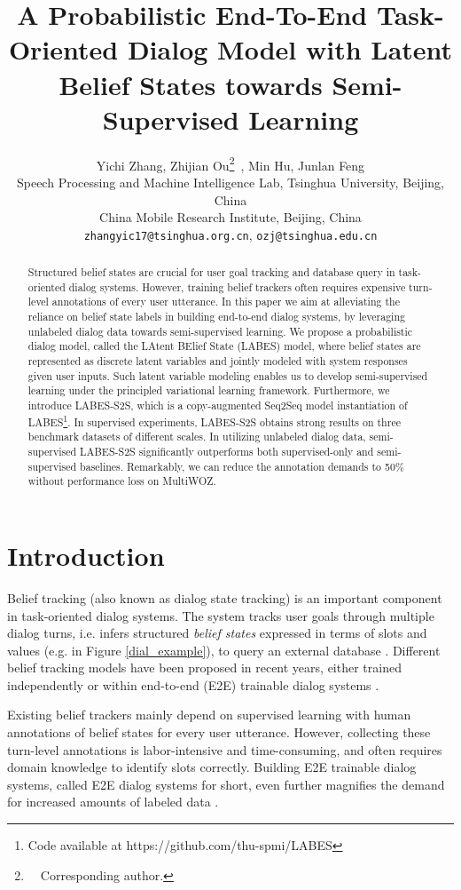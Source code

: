 \documentclass[11pt,a4paper]{article}
\title{A Probabilistic End-To-End Task-Oriented Dialog Model with Latent Belief States towards Semi-Supervised Learning}
\author{Yichi Zhang, Zhijian Ou\thanks{~~Corresponding author.}~, Min Hu, Junlan Feng  \\
	 Speech Processing and Machine Intelligence Lab, Tsinghua University, Beijing, China \\
	 China Mobile Research Institute, Beijing, China \\
	{\tt zhangyic17@tsinghua.org.cn}, {\tt ozj@tsinghua.edu.cn}}
\date{}
\newcommand{\modelname}{LABES}
\begin{document}
	\maketitle
	\begin{abstract}
Structured belief states are crucial for user goal tracking and database query in task-oriented dialog systems. However, training belief trackers often requires expensive turn-level annotations of every user utterance.
		In this paper we aim at alleviating the reliance on belief state labels in building end-to-end dialog systems, by leveraging unlabeled dialog data towards semi-supervised learning.
		We propose a probabilistic dialog model, called the LAtent BElief State (\modelname{}) model, where belief states are represented as discrete latent variables and jointly modeled with system responses given user inputs.
		Such latent variable modeling enables us to develop semi-supervised learning under the principled variational learning framework.
		Furthermore, we introduce LABES-S2S, which is a copy-augmented Seq2Seq model instantiation of LABES\footnote{Code available at https://github.com/thu-spmi/LABES}.
		In supervised experiments, LABES-S2S obtains strong results on three benchmark datasets of different scales. In utilizing unlabeled dialog data, semi-supervised LABES-S2S significantly outperforms both supervised-only and semi-supervised baselines.
		Remarkably, we can reduce the annotation demands to 50\% without performance loss on MultiWOZ. 
	\end{abstract}
	
	\section{Introduction}
Belief tracking (also known as dialog state tracking) is an important component in task-oriented dialog systems. The system tracks user goals through multiple dialog turns, i.e. infers structured \textit{belief states} expressed in terms of slots and values (e.g. in Figure \ref{dial_example}), to query an external database \cite{henderson2014second}.
	Different belief tracking models have been proposed in recent years, either trained independently \cite{mrkvsic2017neural,ren2018towards,wu2019transferable} or within end-to-end (E2E) trainable dialog systems \cite{wen2017latent,wen2017a,liu2017end,lei2018sequicity,fsdm,liang2020moss,zhang2020task}.
	
Existing belief trackers mainly depend on supervised learning with human annotations of belief states for every user utterance. However, collecting these turn-level annotations is labor-intensive and time-consuming, and often requires domain knowledge to identify slots correctly. Building E2E trainable dialog systems, called E2E dialog systems for short, even further magnifies the demand for increased amounts of labeled data \cite{gao2020paraphrase,zhang2020task}. 
	
\end{document}
